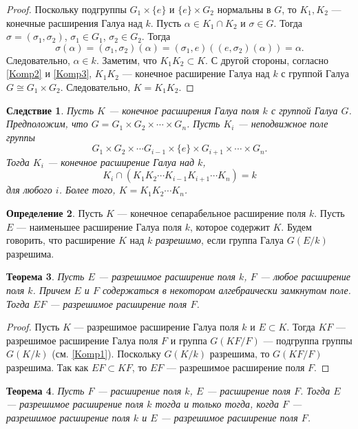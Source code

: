 \documentclass[12pt, titlepage, oneside]{amsbook}
\newtheorem{theorem}{Теорема}[chapter]
\newtheorem{corollary}[theorem]{Следствие}
\theoremstyle{definition}
\newtheorem{definition}[theorem]{Определение}
\theoremstyle{remark}
\begin{document}
\begin{proof}
Поскольку подгруппы $G_1\times \{e\}$ и $\{e\}\times G_2$ нормальны в $G$, то $K_1,K_2$ --- конечные расширения Галуа над $k$. Пусть $\alpha\in K_1\cap K_2$ и $\sigma\in G$. Тогда $\sigma=(\sigma_1,\sigma_2)$, $\sigma_1\in G_1$, $\sigma_2\in G_2$. Тогда $$\sigma(\alpha)=(\sigma_1,\sigma_2)(\alpha)=(\sigma_1,e)((e,\sigma_2)(\alpha))=\alpha.$$ Следовательно, $\alpha\in k$. Заметим, что $K_1K_2\subset K$. С другой стороны, согласно \ref{Komp2} и \ref{Komp3}, $K_1K_2$ --- конечное расширение Галуа над $k$ с группой Галуа $G\cong G_1\times G_2$. Следовательно, $K=K_1K_2$.
\end{proof}

\begin{corollary}
\label{Komp6}
Пусть $K$ --- конечное расширения Галуа поля $k$ с группой Галуа $G$. Предположим, что $G=G_1\times G_2\times\cdots\times G_n$. Пусть $K_i$ --- неподвижное поле группы $$G_1\times G_2\times\cdots G_{i-1}\times\{e\}\times G_{i+1}\times\cdots\times G_n.$$ Тогда $K_i$ --- конечное расширение Галуа над $k$, $$K_i\cap (K_1K_2\cdots K_{i-1}K_{i+1}\cdots K_n)=k$$ для любого $i$. Более того, $K=K_1K_2\cdots K_n$.
\end{corollary}

\begin{definition}
Пусть $K$ --- конечное сепарабельное расширение поля $k$. Пусть $E$ --- наименьшее расширение Галуа поля $k$, которое содержит $K$. Будем говорить, что расширение $K$ над $k$ \emph{разрешимо}, если группа Галуа $G(E/k)$ разрешима.
\end{definition}

\begin{theorem}
\label{Razr1}
Пусть $E$ --- разрешимое расширение поля $k$, $F$ --- любое расширение поля $k$. Причем $E$ и $F$ содержаться в некотором алгебраически замкнутом поле. Тогда $EF$ --- разрешимое расширение поля $F$.
\end{theorem}

\begin{proof}
Пусть $K$ --- разрешимое расширение Галуа поля $k$ и $E\subset K$. Тогда $KF$ --- разрешимое расширение Галуа поля $F$ и группа $G(KF/F)$ --- подгруппа группы $G(K/k)$ (см. \ref{Komp1}). Поскольку $G(K/k)$ разрешима, то $G(KF/F)$ разрешима. Так как $EF\subset KF$, то $EF$ --- разрешимое расширение поля $F$.
\end{proof}

\begin{theorem}
\label{Razr2}
Пусть $F$ --- расширение поля $k$, $E$ --- расширение поля $F$. Тогда $E$ --- разрешимое расширение поля $k$ тогда и только тогда, когда $F$ --- разрешимое расширение поля $k$ и $E$ --- разрешимое расширение поля $F$.
\end{theorem}
\end{document}
